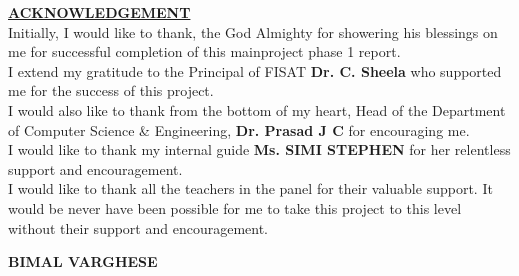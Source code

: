 
    {\centering
    {\large \textbf{\underline{ACKNOWLEDGEMENT}}}
    \\[4\baselineskip]}
    {Initially, I would like to thank, the God Almighty for showering his blessings on me for successful completion of this mainproject phase 1 report.\\[.4cm]
I extend my gratitude to the Principal of FISAT \textbf{Dr. C. Sheela} who supported me for the success of this project.\\[.4cm]
I would also like to thank from the bottom of my heart, Head of the Department of Computer Science \& Engineering, \textbf{Dr. Prasad J C} for encouraging me.\\[.4cm]
I would like to thank my internal guide \textbf{Ms. SIMI STEPHEN} for her relentless support and encouragement.\\[.4cm]
I would like to thank all the teachers in the panel for their valuable support. It
would be never have been possible for me to take this project to this level
without their support and encouragement.
 }\\[4\baselineskip]
        
    \begin{flushright}
    \bf BIMAL VARGHESE\\
    \end{flushright}
